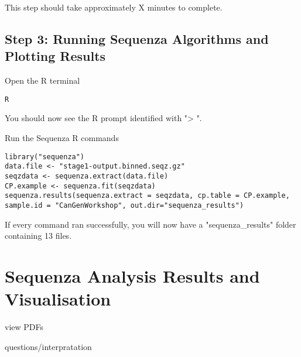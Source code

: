 This step should take approximately X minutes to complete.


\subsection{Step 3: Running Sequenza Algorithms and Plotting Results}

\begin{steps}
Open the R terminal
\begin{lstlisting}
R
\end{lstlisting}
\end{steps}

You should now see the R prompt identified with "> ".

\begin{steps}
Run the Sequenza R commands
\begin{lstlisting}
library("sequenza")
data.file <- "stage1-output.binned.seqz.gz"
seqzdata <- sequenza.extract(data.file)
CP.example <- sequenza.fit(seqzdata)
sequenza.results(sequenza.extract = seqzdata, cp.table = CP.example, sample.id = "CanGenWorkshop", out.dir="sequenza_results")
\end{lstlisting}
\end{steps}

If every command ran successfully, you will now have a "sequenza_results" folder containing 13 files.


\newpage


\section{Sequenza Analysis Results and Visualisation}


view PDFs

questions/interpratation


\newpage


